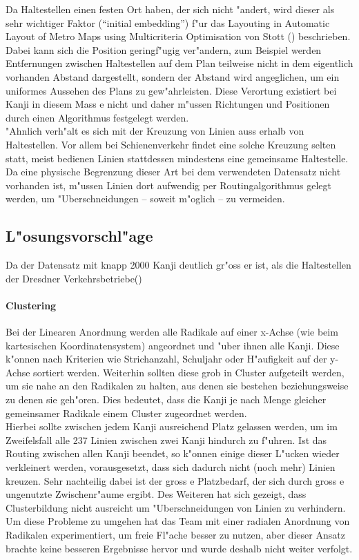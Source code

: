 Da Haltestellen einen festen Ort haben, der sich nicht "andert, wird dieser als sehr wichtiger Faktor ("`initial embedding"') f"ur das Layouting in Automatic Layout of Metro Maps using Multicriteria Optimisation von Stott (\cite{automaticlayoutmetro08}) beschrieben. Dabei kann sich die Position geringf"ugig ver"andern, zum Beispiel werden Entfernungen zwischen Haltestellen auf dem Plan teilweise nicht in dem eigentlich vorhanden Abstand dargestellt, sondern der Abstand wird angeglichen, um ein uniformes Aussehen des Plans zu gew"ahrleisten. Diese Verortung existiert bei Kanji in diesem Mass e nicht und daher m"ussen Richtungen und Positionen durch einen Algorithmus festgelegt werden. \\
"Ahnlich verh"alt es sich mit der Kreuzung von Linien auss erhalb von Haltestellen. Vor allem bei Schienenverkehr findet eine solche Kreuzung selten statt, meist bedienen Linien stattdessen mindestens eine gemeinsame Haltestelle. Da eine physische Begrenzung dieser Art bei dem verwendeten Datensatz nicht vorhanden ist, m"ussen Linien dort aufwendig per Routingalgorithmus gelegt werden, um "Uberschneidungen – soweit m"oglich – zu vermeiden.

\subsection{L"osungsvorschl"age}
Da der Datensatz mit knapp 2000 Kanji deutlich gr"oss er ist, als die Haltestellen der Dresdner Verkehrsbetriebe(\cite{dvbag})
\paragraph{Clustering}
Bei der Linearen Anordnung werden alle Radikale auf einer x-Achse (wie beim kartesischen Koordinatensystem) angeordnet und "uber ihnen alle Kanji. Diese k"onnen nach Kriterien wie Strichanzahl, Schuljahr oder H"aufigkeit auf der y-Achse sortiert werden. Weiterhin sollten diese grob in Cluster aufgeteilt werden, um sie nahe an den Radikalen zu halten, aus denen sie bestehen beziehungsweise zu denen sie geh"oren. Dies bedeutet, dass die Kanji je nach Menge gleicher gemeinsamer Radikale einem Cluster zugeordnet werden. \\
Hierbei sollte zwischen jedem Kanji ausreichend Platz gelassen werden, um im Zweifelsfall alle 237 Linien zwischen zwei Kanji hindurch zu f"uhren. Ist das Routing zwischen allen Kanji beendet, so k"onnen einige dieser L"ucken wieder verkleinert werden, vorausgesetzt, dass sich dadurch nicht (noch mehr) Linien kreuzen. 
Sehr nachteilig dabei ist der gross e Platzbedarf, der sich durch gross e ungenutzte Zwischenr"aume ergibt. Des Weiteren hat sich gezeigt, dass Clusterbildung nicht ausreicht um "Uberschneidungen von Linien zu verhindern. \\
Um diese Probleme zu umgehen hat das Team mit einer radialen Anordnung von Radikalen experimentiert, um freie Fl"ache besser zu nutzen, aber dieser Ansatz brachte keine besseren Ergebnisse hervor und wurde deshalb nicht weiter verfolgt.
